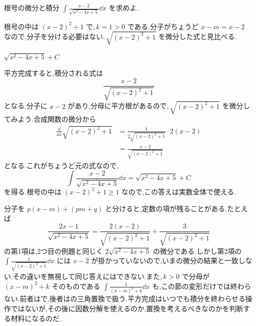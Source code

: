 \begin{example}{根号の微分と積分}
$\int\frac{x-2}{\sqrt{x^2-4x+5}}\dd x$ を求めよ.
\end{example}

根号の中は $(x-2)^2+1$ で,\,$k=1>0$ である.分子がちょうど $x-m=x-2$ なので,分子を分ける必要はない.\,$\sqrt{(x-2)^2+1}$ を微分した式と見比べる.

$\sqrt{x^2-4x+5}+C$

平方完成すると,積分される式は
\[
 \frac{x-2}{\sqrt{(x-2)^2+1}}
\]
となる.分子に $x-2$ があり,分母に平方根があるので,\,$\sqrt{(x-2)^2+1}$ を微分してみよう.合成関数の微分から
\begin{align*}
 \frac{\dd}{\dd x}\sqrt{(x-2)^2+1}
 &=\frac1{2\sqrt{(x-2)^2+1}}\cdot2(x-2)\\
 &=\frac{x-2}{\sqrt{(x-2)^2+1}}
\end{align*}
となる.これがちょうど元の式なので,
\[
 \int\frac{x-2}{\sqrt{x^2-4x+5}}\dd x
 =\sqrt{x^2-4x+5}+C
\]
を得る.根号の中は $(x-2)^2+1\ge1$ なので,この答えは実数全体で使える.

分子を $p(x-m)+(pm+q)$ と分けると,定数の項が残ることがある.たとえば
\[
 \frac{2x-1}{\sqrt{x^2-4x+5}}
 =\frac{2(x-2)}{\sqrt{(x-2)^2+1}}+\frac{3}{\sqrt{(x-2)^2+1}}
\]
の第1項は,2つ目の例題と同じく $2\sqrt{x^2-4x+5}$ の微分である.しかし第2項の $\int\frac1{\sqrt{(x-2)^2+1}}\dd x$ には $x-2$ が掛かっていないので,いまの微分の結果と一致しない.その違いを無視して同じ答えにはできない.また,\,$k>0$ で分母が $(x-m)^2+k$ そのものである $\int\frac1{(x-m)^2+k}\dd x$ も,この節の変形だけでは終わらない.前者はで,後者はの三角置換で扱う.平方完成はいつでも積分を終わらせる操作ではないが,その後に因数分解を使えるのか,置換を考えるべきなのかを判断する材料になるのだ.
